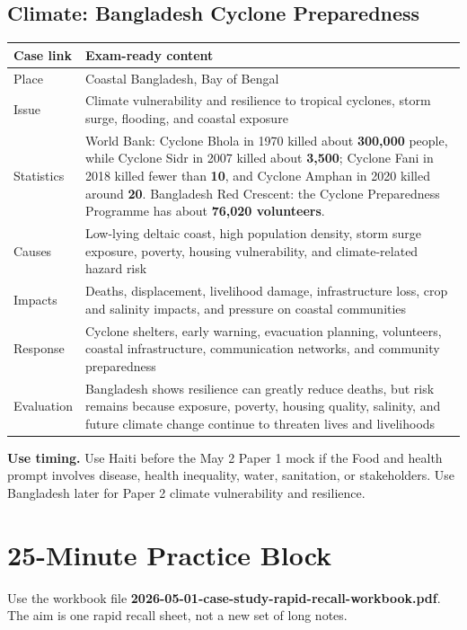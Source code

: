 \documentclass[11pt,a4paper]{article}
\newcommand{\term}[1]{\textcolor{HeadingBlue}{\textbf{#1}}}
\newcommand{\boxnote}[3]{%
\noindent\colorbox{#1}{%
  \begin{minipage}{0.965\textwidth}
  \sffamily
  \textbf{\textcolor{HeadingBlue}{#2}} #3
  \end{minipage}
}}
\begin{document}
\subsection{Climate: Bangladesh Cyclone Preparedness}

\begin{tabularx}{\textwidth}{L{0.18\textwidth}Y}
\toprule
\textbf{Case link} & \textbf{Exam-ready content} \\
\midrule
Place & Coastal Bangladesh, Bay of Bengal \\
Issue & Climate vulnerability and resilience to tropical cyclones, storm surge,
flooding, and coastal exposure \\
Statistics & World Bank: Cyclone Bhola in 1970 killed about \term{300,000}
people, while Cyclone Sidr in 2007 killed about \term{3,500}; Cyclone Fani in
2018 killed fewer than \term{10}, and Cyclone Amphan in 2020 killed around
\term{20}. Bangladesh Red Crescent: the Cyclone Preparedness Programme has
about \term{76,020 volunteers}. \\
Causes & Low-lying deltaic coast, high population density, storm surge exposure,
poverty, housing vulnerability, and climate-related hazard risk \\
Impacts & Deaths, displacement, livelihood damage, infrastructure loss, crop and
salinity impacts, and pressure on coastal communities \\
Response & Cyclone shelters, early warning, evacuation planning, volunteers,
coastal infrastructure, communication networks, and community preparedness \\
Evaluation & Bangladesh shows resilience can greatly reduce deaths, but risk
remains because exposure, poverty, housing quality, salinity, and future
climate change continue to threaten lives and livelihoods \\
\bottomrule
\end{tabularx}

\boxnote{SoftTint}{Use timing.}{Use Haiti before the May 2 Paper 1 mock if the
Food and health prompt involves disease, health inequality, water, sanitation,
or stakeholders. Use Bangladesh later for Paper 2 climate vulnerability and
resilience.}

\section{25-Minute Practice Block}

Use the workbook file
\term{2026-05-01-case-study-rapid-recall-workbook.pdf}. The aim is one rapid
recall sheet, not a new set of long notes.
\end{document}
